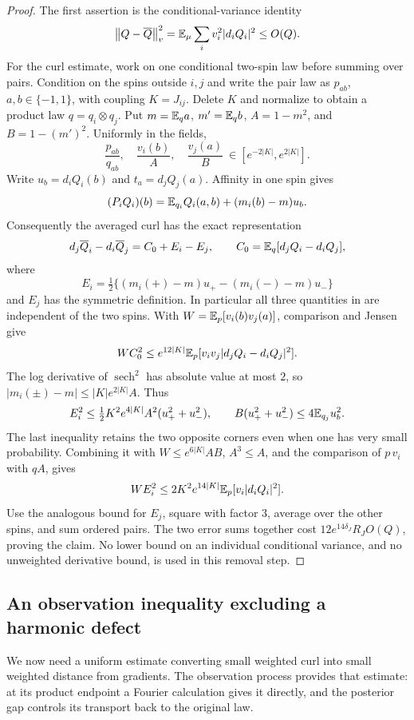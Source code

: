 \begin{proof}
The first assertion is the conditional-variance identity
\[
 \left\lVert Q-\overline Q\right\rVert_v^2
 =\mathbb E_\mu\sum_i v_i^2|d_iQ_i|^2\le O(Q).
\]
For the curl estimate, work on one conditional two-spin law before
summing over pairs.  Condition on the spins outside $i,j$ and write the
pair law as $p_{ab}$, $a,b\in\{-1,1\}$, with coupling $K=J_{ij}$.
Delete $K$ and normalize to obtain a product law $q=q_i\otimes q_j$.
Put $m=\mathbb E_q a$, $m'=\mathbb E_q b$, $A=1-m^2$, and $B=1-(m')^2$.
Uniformly in the fields,
\[
 \frac{p_{ab}}{q_{ab}},\quad\frac{v_i(b)}A,
 \quad\frac{v_j(a)}B\ \in[e^{-2|K|},e^{2|K|}].
\]
Write $u_b=d_iQ_i(b)$ and $t_a=d_jQ_j(a)$.  Affinity in one spin gives
\[
 (P_iQ_i)(b)=\mathbb E_{q_i}Q_i(a,b)+(m_i(b)-m)u_b.
\]
Consequently the averaged curl has the exact representation
\begin{equation}\label{eq:exact-average-difference}
 d_j\overline Q_i-d_i\overline Q_j=C_0+E_i-E_j,
 \qquad C_0=\mathbb E_q[d_jQ_i-d_iQ_j],
\end{equation}
where
\[
 E_i=\tfrac12\{(m_i(+)-m)u_+-(m_i(-)-m)u_-\}
\]
and $E_j$ has the symmetric definition.  In particular all three
quantities in  are independent of the
two spins.  With $W=\mathbb E_p[v_i(b)v_j(a)]$, comparison and Jensen give
\[
 WC_0^2\le e^{12|K|}\mathbb E_p[v_iv_j|d_jQ_i-d_iQ_j|^2].
\]
The log derivative of $\operatorname{sech}^2$ has absolute value at most
$2$, so $|m_i(\pm)-m|\le|K|e^{2|K|}A$.  Thus
\[
 E_i^2\le\tfrac12K^2e^{4|K|}A^2(u_+^2+u_-^2),
 \qquad B(u_+^2+u_-^2)\le4\mathbb E_{q_j}u_b^2.
\]
The last inequality retains the two opposite corners even when one has
very small probability.  Combining it with $W\le e^{6|K|}AB$,
$A^3\le A$, and the comparison of $p\,v_i$ with $qA$, gives
\[
 WE_i^2\le2K^2e^{14|K|}\mathbb E_p[v_i|d_iQ_i|^2].
\]
Use the analogous bound for $E_j$, square
 with factor $3$, average over the
other spins, and sum ordered pairs.  The two error sums together cost
$12e^{14\delta_J}R_JO(Q)$, proving the claim.  No lower bound on an
individual conditional variance, and no unweighted derivative bound,
is used in this removal step.
\end{proof}

\subsection{An observation inequality excluding a harmonic defect}

We now need a uniform estimate converting small weighted curl into
small weighted distance from gradients.  The observation process provides
that estimate: at its product endpoint a Fourier calculation gives it
directly, and the posterior gap controls its transport back to the
original law.

